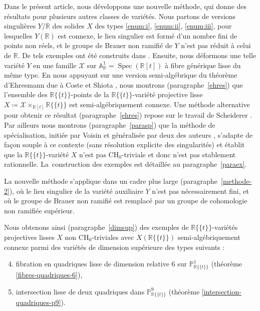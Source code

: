 \documentclass[11pt]{article}
\newenvironment{enumeratei}
{\bgroup\def\theenumi{\roman{enumi}}\def\theenumii{\arabic{enumii}}\begin{enumerate}}
{\end{enumerate}\egroup}
\newcommand{\CH}{\mathrm{CH}}
\theoremstyle{definition}
\newcommand{\R}{\mathbb R}
\newcommand{\A}{\mathbb A}
\renewcommand{\P}{\mathbb P}
\newcommand{\Spec}{\operatorname{Spec}}
\newcommand{\mc}[1]{\mathcal{#1}}
\newcommand{\puiseux}{\mathbb{R}\{\!\{t\}\!\}}
\begin{document}
Dans le présent article, nous développons une nouvelle méthode, qui
donne des résultats pour plusieurs autres classes de variétés. Nous partons de versions singulières $Y/\R$ des solides $X$ des types \eqref{enum:i}, \eqref{enum:ii}, \eqref{enum:iii}, pour lesquelles
$Y(\R)$ est connexe, le lieu singulier est formé d'un nombre fini de points non réels,
et le groupe de Brauer non ramifié de $Y$ n'est pas réduit à celui de $\R$. De tels exemples ont été construits dans \cite{colliot2024certaines}.
Ensuite, nous déformons une telle variété $Y$ en une famille $\mc{X}$ sur $\A^1_\R=\Spec (\R[t])$ à fibre générique lisse du même type. En nous appuyant sur une version semi-algébrique du théorème d'Ehresmann due à Coste et Shiota \cite{coste1992nash}, nous montrons (paragraphe~\ref{ehres}) que l'ensemble des $\puiseux$-points de la $\puiseux$-variété projective lisse $X\coloneqq \mc{X}\times_{\R[t]}\puiseux$ est semi-algébriquement connexe. Une méthode alternative pour obtenir ce résultat (paragraphe~\ref{ehres}) repose sur le travail de Scheiderer \cite{scheiderer1994real}.
Par ailleurs nous montrons (paragraphe~\ref{parasp}) que la méthode de spécialisation, initiée par Voisin et généralisée par deux des auteurs \cite{colliot2016hypersurfaces}, s'adapte de façon souple à ce contexte
(sans résolution explicite des singularités)
et établit que la $\puiseux$-variété $X$ n'est pas
$\CH_0$-triviale et donc n'est pas stablement rationnelle. La~construction des exemples est détaillée au paragraphe~\ref{paraex}.

\medskip

La nouvelle méthode s'applique dans un cadre plus large (paragraphe~\ref{methode-2}),
où le lieu singulier de la variété auxiliaire $Y$ n'est pas
nécessairement fini, et où le groupe de Brauer non ramifié est remplacé par un groupe de cohomologie non ramifiée supérieur.

Nous obtenons ainsi (paragraphe~\ref{dimsup}) des exemples de $\puiseux$-variétés projectives lisses $X$ non $\CH_0$-triviales avec $X(\puiseux)$ semi-algébriquement connexe
parmi des variétés de dimension supérieure des types suivants :
\begin{enumeratei}\setcounter{enumi}{3}
\item\label{enum:iv} fibration en quadriques lisse de dimension relative $6$ sur $\P^1_{\puiseux}$ (théorème \ref{fibres-quadriques-6}),
\item\label{enum:v} intersection lisse de deux quadriques dans $\P^9_{\puiseux}$ (théorème \ref{intersection-quadriques-p9}).
\end{enumeratei}
\end{document}
